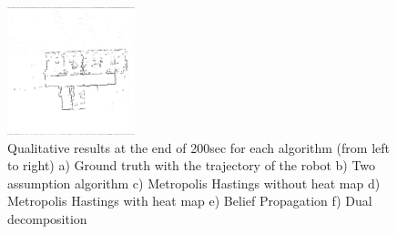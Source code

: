 \documentclass[letterpaper, 10 pt, conference]{ieeeconf} %
\begin{document}
\begin{figure}
  \includegraphics[width=0.33\textwidth, trim=65px 125px 20px 175px, clip]{../../Data/albertb.sm/dualdecomposition.png}%
  \caption{Qualitative results at the end of 200sec for each algorithm (from left to right) a) Ground truth with the trajectory of the robot b) Two assumption algorithm c) Metropolis Hastings without heat map d) Metropolis Hastings with heat map e) Belief Propagation  f) Dual decomposition}
  \label{fig:convergence-comparison-visuals-albertb}
\end{figure}



  
\end{document}
